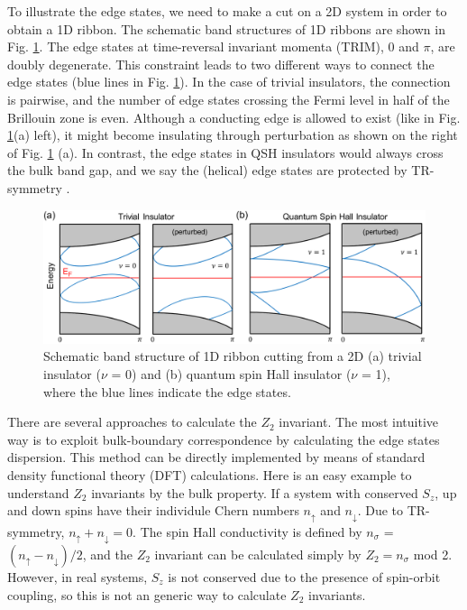 To illustrate the edge states, we need to make a cut on a 2D system in order to obtain a 1D ribbon. The schematic band structures of 1D ribbons are shown in Fig. \ref{fig:Z2}. The edge states at time-reversal invariant momenta (TRIM), 0 and $\pi$, are doubly degenerate. This constraint leads to two different ways to connect the edge states (blue lines in Fig. \ref{fig:Z2}). In the case of trivial insulators, the connection is pairwise, and the number of edge states crossing the Fermi level in half of the Brillouin zone is even. Although a conducting edge is allowed to exist (like in Fig. \ref{fig:Z2}(a) left), it might become insulating through perturbation as shown on the right of Fig. \ref{fig:Z2} (a). In contrast, the edge states in QSH insulators would always cross the bulk band gap, and we say the (helical) edge states are protected by TR-symmetry \cite{hasan2010colloquium}.
    \begin{figure}[htbp]
        \centering
        \captionsetup{singlelinecheck = false, justification=justified}
        \includegraphics[width=1.0\textwidth]{Z2_perturbed.png}
        \caption[Schematic plots of two topologically different band structures]{Schematic band structure of 1D ribbon cutting from a 2D (a) trivial insulator ($\nu$ = 0) and (b) quantum spin Hall insulator ($\nu$ = 1), where the blue lines indicate the edge states.}
        \label{fig:Z2}
    \end{figure}
    
There are several approaches to calculate the $Z_2$ invariant. The most intuitive way is to exploit bulk-boundary correspondence by calculating the edge states dispersion. This method can be directly implemented by means of standard density functional theory (DFT) calculations. Here is an easy example to understand $Z_2$ invariants by the bulk property. If a system with conserved $S_z$, up and down spins have their individule Chern numbers $n_{\uparrow}$ and $n_{\downarrow}$. Due to TR-symmetry, $n_{\uparrow} + n_{\downarrow} = 0$. The spin Hall conductivity is defined by $n_{\sigma}$ = $(n_{\uparrow} - n_{\downarrow})/2$, and the $Z_2$ invariant can be calculated simply by $Z_2 = n_{\sigma}$ mod 2. However, in real systems, $S_z$ is not conserved due to the presence of spin-orbit coupling, so this is not an generic way to calculate $Z_2$ invariants.


